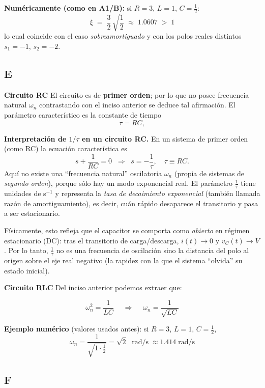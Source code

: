 \textbf{Numéricamente (como en A1/B):} si $R=3$, $L=1$, $C=\tfrac{1}{2}$:
\[
\xi \;=\; \frac{3}{2}\,\sqrt{\frac{1}{2}} \;\approx\; 1.0607 \;>\; 1
\]
lo cual coincide con el caso \emph{sobreamortiguado} y con los polos reales distintos $s_1=-1$, $s_2=-2$.

\subsection{E}

\textbf{Circuito RC}
El circuito es de \textbf{primer orden}; por lo que no posee frecuencia natural \(\omega_n\) contrastando con el inciso anterior se deduce tal afirmación. 
El parámetro característico es la constante de tiempo
\[
\tau = RC,
\]

\textbf{Interpretación de $1/\tau$ en un circuito RC.}
En un sistema de primer orden (como RC) la ecuación característica es
\[
s+\frac{1}{RC}=0 \;\;\Rightarrow\;\; s=-\frac{1}{\tau},\quad \tau\equiv RC.
\]
Aquí no existe una “frecuencia natural” oscilatoria \(\omega_n\) (propia de sistemas de \emph{segundo orden}), porque sólo hay un modo exponencial real. 
El parámetro \(\tfrac{1}{\tau}\) tiene unidades de s\(^{-1}\) y representa la \emph{tasa de decaimiento exponencial} (también llamada razón de amortiguamiento), es decir, cuán rápido desaparece el transitorio y pasa a ser estacionario.

Físicamente, esto refleja que el capacitor se comporta como \emph{abierto} en régimen estacionario (DC): tras el transitorio de carga/descarga, \(i(t)\to 0\) y \(v_C(t)\to V\). 
Por lo tanto, \(\tfrac{1}{\tau}\) no es una frecuencia de oscilación sino la distancia del polo al origen sobre el eje real negativo (la rapidez con la que el sistema “olvida” su estado inicial).


\bigskip

\textbf{Circuito RLC}
Del inciso anterior podemos extraer que:

\[
\boxed{\;\omega_n^2=\frac{1}{LC}\;} \quad\Longrightarrow\quad
\boxed{\;\omega_n=\frac{1}{\sqrt{LC}}\;}
\]

\textbf{Ejemplo numérico} (valores usados antes): si \(R=3\), \(L=1\), \(C=\tfrac{1}{2}\),
\[
\omega_n=\frac{1}{\sqrt{1\cdot \tfrac{1}{2}}}=\sqrt{2}\;\text{ rad/s}\;\approx 1.414\;\text{rad/s}
\]

\subsection{F}

